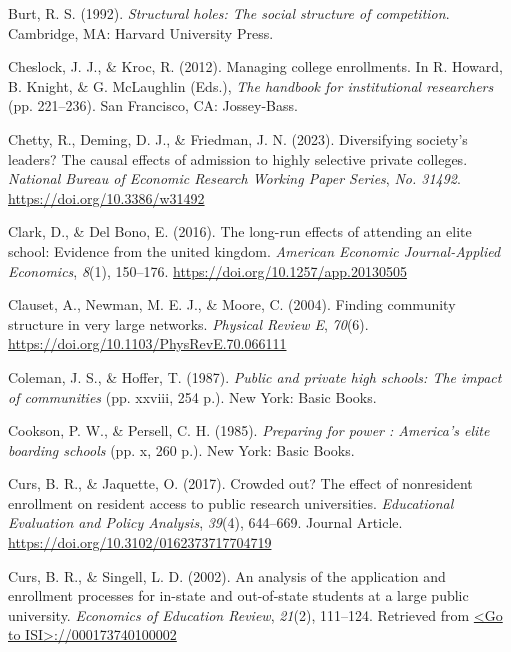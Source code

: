 \documentclass[
  12pt,
]{article}
\newlength{\cslhangindent}
\newlength{\cslentryspacingunit} %
\newenvironment{CSLReferences}[2] %
 {%
  \setlength{\parindent}{0pt}
  \ifodd #1
  \let\oldpar\par
  \def\par{\hangindent=\cslhangindent\oldpar}
  \fi
  \setlength{\parskip}{#2\cslentryspacingunit}
 }%
 {}
\begin{document}
\begin{CSLReferences}{1}{0}
\leavevmode{}%
Burt, R. S. (1992). \emph{Structural holes: The social structure of competition}. Cambridge, MA: Harvard University Press.

\leavevmode{}%
Cheslock, J. J., \& Kroc, R. (2012). Managing college enrollments. In R. Howard, B. Knight, \& G. McLaughlin (Eds.), \emph{The handbook for institutional researchers} (pp. 221--236). San Francisco, CA: Jossey-Bass.

\leavevmode{}%
Chetty, R., Deming, D. J., \& Friedman, J. N. (2023). Diversifying society's leaders? The causal effects of admission to highly selective private colleges. \emph{National Bureau of Economic Research Working Paper Series}, \emph{No. 31492}. \url{https://doi.org/10.3386/w31492}

\leavevmode{}%
Clark, D., \& Del Bono, E. (2016). The long-run effects of attending an elite school: Evidence from the united kingdom. \emph{American Economic Journal-Applied Economics}, \emph{8}(1), 150--176. \url{https://doi.org/10.1257/app.20130505}

\leavevmode{}%
Clauset, A., Newman, M. E. J., \& Moore, C. (2004). Finding community structure in very large networks. \emph{Physical Review E}, \emph{70}(6). \url{https://doi.org/10.1103/PhysRevE.70.066111}

\leavevmode{}%
Coleman, J. S., \& Hoffer, T. (1987). \emph{Public and private high schools: The impact of communities} (pp. xxviii, 254 p.). New York: Basic Books.

\leavevmode{}%
Cookson, P. W., \& Persell, C. H. (1985). \emph{Preparing for power : America's elite boarding schools} (pp. x, 260 p.). New York: Basic Books.

\leavevmode{}%
Curs, B. R., \& Jaquette, O. (2017). Crowded out? The effect of nonresident enrollment on resident access to public research universities. \emph{Educational Evaluation and Policy Analysis}, \emph{39}(4), 644--669. Journal Article. \url{https://doi.org/10.3102/0162373717704719}

\leavevmode{}%
Curs, B. R., \& Singell, L. D. (2002). An analysis of the application and enrollment processes for in-state and out-of-state students at a large public university. \emph{Economics of Education Review}, \emph{21}(2), 111--124. Retrieved from \href{\%3CGo\%20to\%20ISI\%3E://000173740100002}{\textless Go to ISI\textgreater://000173740100002}


\end{CSLReferences}
\end{document}

